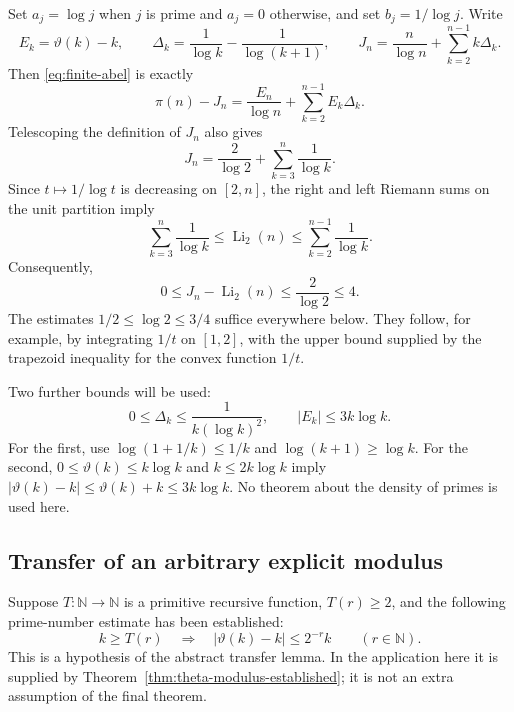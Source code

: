Set $a_j=\log j$ when $j$ is prime and $a_j=0$ otherwise, and set
$b_j=1/\log j$.  Write
\[
 E_k=\vartheta(k)-k,\qquad
 \Delta_k=\frac1{\log k}-\frac1{\log(k+1)},\qquad
 J_n=\frac n{\log n}+\sum_{k=2}^{n-1}k\Delta_k.
\]
Then \eqref{eq:finite-abel} is exactly
\begin{equation}\label{eq:pi-discrete-transfer}
 \pi(n)-J_n=\frac{E_n}{\log n}
                  +\sum_{k=2}^{n-1}E_k\Delta_k.
\end{equation}
Telescoping the definition of $J_n$ also gives
\begin{equation}\label{eq:discrete-reference}
 J_n=\frac2{\log2}+\sum_{k=3}^n\frac1{\log k}.
\end{equation}
Since $t\mapsto1/\log t$ is decreasing on $[2,n]$, the right and left
Riemann sums on the unit partition imply
\[
 \sum_{k=3}^n\frac1{\log k}
 \le \operatorname{Li}_2(n)
 \le \sum_{k=2}^{n-1}\frac1{\log k}.
\]
Consequently,
\begin{equation}\label{eq:discrete-Li-error}
 0\le J_n-\operatorname{Li}_2(n)\le\frac2{\log2}\le4.
\end{equation}
The estimates $1/2\le\log2\le3/4$ suffice everywhere below.  They follow,
for example, by integrating $1/t$ on $[1,2]$, with the upper bound supplied
by the trapezoid inequality for the convex function $1/t$.

Two further bounds will be used:
\begin{equation}\label{eq:delta-and-trivial}
 0\le\Delta_k\le\frac1{k(\log k)^2},
 \qquad |E_k|\le3k\log k.
\end{equation}
For the first, use $\log(1+1/k)\le1/k$ and
$\log(k+1)\ge\log k$.
For the second, $0\le\vartheta(k)\le k\log k$ and
$k\le2k\log k$ imply
$|\vartheta(k)-k|\le\vartheta(k)+k\le3k\log k$.
No theorem about the density of primes is used here.

\subsection{Transfer of an arbitrary explicit modulus}

Suppose $T:\mathbb N\to\mathbb N$ is a primitive recursive function,
$T(r)\ge2$, and the following prime-number estimate has been established:
\begin{equation}\tag{$H_\vartheta$}\label{hyp:theta-modulus}
 k\ge T(r)\quad\Longrightarrow\quad
 |\vartheta(k)-k|\le2^{-r}k
 \qquad(r\in\mathbb N).
\end{equation}
This is a hypothesis of the abstract transfer lemma. In the application here
it is supplied by Theorem~\ref{thm:theta-modulus-established}; it is not an
extra assumption of the final theorem.


